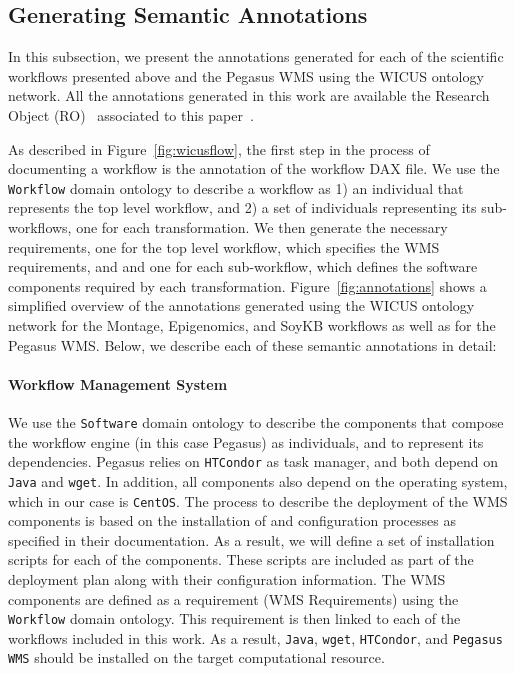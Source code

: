 \subsection{Generating Semantic Annotations}

In this subsection, we present the annotations generated for each of the scientific 
workflows presented above and the Pegasus WMS using the WICUS ontology
network. All the annotations generated in this work are available  the 
Research Object (RO)~\cite{researchObjects} associated to this paper~\cite{fgcs-2015-object}.

 As described in Figure~\ref{fig:wicusflow}, the first step in the process of 
documenting a workflow is the annotation of the workflow DAX file. We use the 
\texttt{Workflow} domain ontology to describe a workflow as 1) an individual that 
represents the top level workflow, and 2) a set of individuals representing its 
sub-workflows, one for each transformation. We then generate the necessary 
requirements, one for the top level workflow, which specifies the WMS requirements, and
and one for each sub-workflow, which defines the software components required 
by each transformation. 
Figure~\ref{fig:annotations} shows a simplified overview of the annotations generated 
using the WICUS ontology network for the Montage, Epigenomics, and SoyKB 
workflows as well as for the Pegasus WMS. Below, we describe each of these
semantic annotations in detail:


\paragraph{\textbf{Workflow Management System}}
We use the \texttt{Software} domain ontology to describe the components that
compose the workflow engine (in this case Pegasus) as individuals, and to 
represent its dependencies. Pegasus relies on \texttt{HTCondor} as  task manager, and 
both depend on \texttt{Java} and \texttt{wget}. In addition, all components also
depend on the operating system, which in our case is \texttt{CentOS}. The process
to describe the deployment of the WMS components is based on the installation of
and configuration processes as specified in their documentation. As a result, we will
define a set of installation scripts for each of the components. These scripts are 
included as part of the deployment plan along with their configuration information.
The WMS components are defined as a requirement (WMS Requirements) using
the \texttt{Workflow} domain ontology. This requirement is then linked to each
of the workflows included in this work. As a result, \texttt{Java}, \texttt{wget}, 
\texttt{HTCondor}, and \texttt{Pegasus WMS} should be installed on the target
computational resource.


